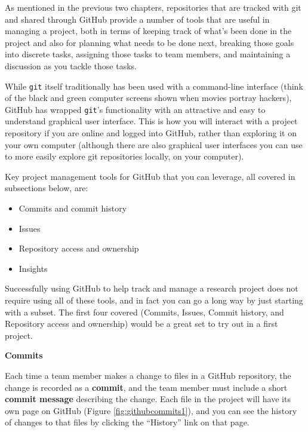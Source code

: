 \documentclass[]{tufte-book}
\providecommand{\tightlist}{%
  \setlength{\itemsep}{0pt}\setlength{\parskip}{0pt}}
\begin{document}
As mentioned in the previous two chapters, repositories that are tracked with
git and shared through GitHub provide a number of tools that are useful in
managing a project, both in terms of keeping track of what's been done in the
project and also for planning what needs to be done next, breaking those goals
into discrete tasks, assigning those tasks to team members, and maintaining a
discussion as you tackle those tasks.

While \texttt{git} itself traditionally has been used with a command-line interface
(think of the black and green computer screens shown when movies portray
hackers), GitHub has wrapped \texttt{git}'s functionality with an attractive and easy
to understand graphical user interface. This is how you will interact with a
project repository if you are online and logged into GitHub, rather than
exploring it on your own computer (although there are also graphical user
interfaces you can use to more easily explore git repositories locally, on your
computer).

Key project management tools for GitHub that you can leverage, all covered in
subsections below, are:

\begin{itemize}
\tightlist
\item
  Commits and commit history
\item
  Issues
\item
  Repository access and ownership
\item
  Insights
\end{itemize}

Successfully using GitHub to help track and manage a research project does not
require using all of these tools, and in fact you can go a long way by just starting
with a subset. The first four covered (Commits, Issues, Commit history, and Repository access
and ownership) would be a great set to try out in a first project.

\textbf{Commits}

Each time a team member makes a change to files in a GitHub repository, the change is
recorded as a \textbf{commit}, and the team member must include a short \textbf{commit message}
describing the change. Each file in the project will have its own page on GitHub
(Figure \ref{fig:githubcommits1}), and you can see the history of changes to that
files by clicking the ``History'' link on that page.
\end{document}

